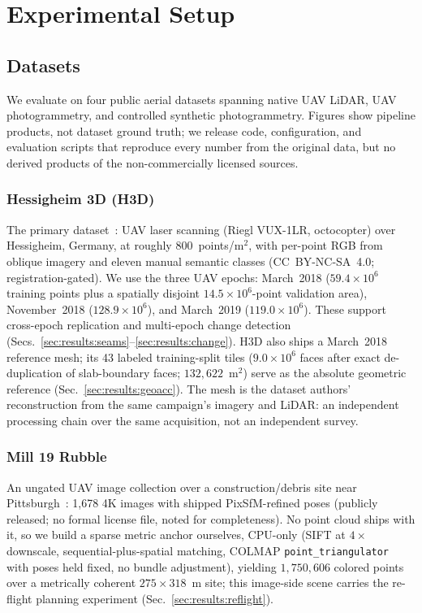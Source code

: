 
\section{Experimental Setup}
\label{sec:setup}

\subsection{Datasets}
\label{sec:setup:datasets}

We evaluate on four public aerial datasets spanning native UAV LiDAR,
UAV photogrammetry, and controlled synthetic photogrammetry. Figures
show pipeline products, not dataset ground truth; we release code,
configuration, and evaluation scripts that reproduce every number from
the original data, but no derived products of the non-commercially
licensed sources.

\subsubsection{Hessigheim 3D (H3D)}
 The primary dataset~\cite{koelle2021h3d}: UAV laser scanning (Riegl
VUX-1LR, octocopter) over Hessigheim, Germany, at roughly
$800$~points/m$^2$, with per-point RGB from oblique imagery
and eleven manual semantic classes (CC~BY-NC-SA~4.0;
registration-gated). We use the three UAV epochs: March~2018
($59.4\times10^{6}$ training points plus a spatially disjoint
$14.5\times10^{6}$-point validation area), November~2018
($128.9\times10^{6}$), and March~2019 ($119.0\times10^{6}$). These
support cross-epoch replication and multi-epoch change detection
(Secs.~\ref{sec:results:seams}--\ref{sec:results:change}). H3D also
ships a March~2018 reference mesh; its 43 labeled training-split tiles
($9.0\times10^{6}$ faces after exact de-duplication of slab-boundary
faces; $132{,}622$~m$^2$) serve as the absolute geometric reference
(Sec.~\ref{sec:results:geoacc}). The mesh is the dataset authors'
reconstruction from the same campaign's imagery and LiDAR: an
independent processing chain over the same acquisition, not an
independent survey.

\subsubsection{Mill 19 Rubble}
 An ungated UAV image collection over a construction/debris site near
Pittsburgh~\cite{turki2022meganerf}: 1{,}678 4K images with shipped
PixSfM-refined poses (publicly released; no formal license file, noted
for completeness). No point cloud ships with it, so we build a sparse
metric anchor ourselves, CPU-only (SIFT at $4\times$ downscale,
sequential-plus-spatial matching, COLMAP
\texttt{point\_triangulator}~\cite{schonberger2016colmap} with poses
held fixed, no bundle adjustment), yielding
$1{,}750{,}606$ colored points over a metrically coherent
$275\times318$~m site; this image-side scene carries the re-flight
planning experiment (Sec.~\ref{sec:results:reflight}).

